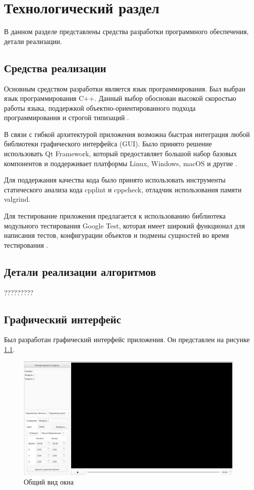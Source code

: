 \chapter{Технологический раздел}
\label{cha:impl}
В данном разделе представлены средства разработки программного
обеспечения, детали реализации.

\section{Средства реализации}

Основным средством разработки является язык программирования. Был выбран язык программирования C++. Данный выбор обоснован высокой скоростью работы языка, поддержкой объектно-ориентированного подхода программирования и строгой типизаций \cite{cpplang}. 

В связи с гибкой архитектурой приложения возможна быстрая интеграция любой библиотеки графического интерфейса (GUI). Было принято решение использовать Qt Framework, который предоставляет большой набор базовых компонентов и поддерживает платформы Linux, Windows, macOS и другие \cite{qt_widgets}. 

Для поддержания качества кода было принято использовать инструменты статического анализа кода cpplint\cite{cpplint} и cppcheck\cite{cppcheck}, отладчик использования памяти valgrind\cite{valgrind}. 

Для тестирование приложения предлагается к использованию библиотека модульного тестирования Google Test, которая имеет широкий функционал для написания тестов, конфигурации объектов и подмены сущностей во время тестирования \cite{googletest}.

\section{Детали реализации алгоритмов}

?????????


\section{Графический интерфейс}

Был разработан графический интерфейс приложения. Он представлен на рисунке \ref{fig:gui_window}. 

\begin{figure}[h]
    \centering
    \includegraphics[width=0.9\columnwidth]{img/gui/common.png}
    \caption{Общий вид окна}
    \label{fig:gui_window}
\end{figure}

